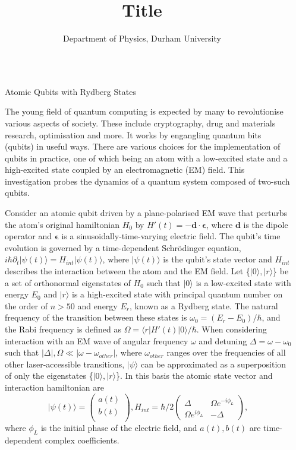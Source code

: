 \documentclass[final]{beamer}
\title{Title}
\author{Department of Physics, Durham University}
\institute[shortinst]{Short abstract.}
\newlength{\sepwidth}
\newlength{\colwidth}
\newcommand{\separatorcolumn}{\begin{column}{\sepwidth}\end{column}}
\begin{document}
\begin{frame}[t]
\begin{columns}[t]
\separatorcolumn

\begin{column}{\colwidth}

  \begin{block}{Atomic Qubits with Rydberg States}

    The young field of quantum computing is expected by many to revolutionise various aspects of society. These include
    cryptography, drug and materials research, optimisation and more. It works by engangling quantum bits (qubits)
    in useful ways. There are various choices for the implementation of qubits in practice, one of which being an atom with a
    low-excited state
    and a high-excited state coupled by an electromagnetic (EM) field. This investigation probes the dynamics of a quantum system
    composed of two-such qubits.

    Consider an atomic qubit driven by a plane-polarised EM wave that perturbs the atom's original hamiltonian $H_0$ by
     $H'(t)=-\mathbf{d} \cdot \mathbf{\epsilon}$,
    where $\mathbf{d}$
    is the dipole operator and $\mathbf{\epsilon}$ is a sinusoidally-time-varying electric field. The qubit's time evolution is
    governed by a time-dependent Schr\"odinger equation, $i\hbar \partial_t |\psi(t)\rangle = H_{int} |\psi(t)\rangle$, where
    $|\psi(t)\rangle$ is the qubit's state vector and $H_{int}$ describes the interaction between the atom and the EM field. Let
    \{$|0\rangle, |r\rangle$\} be a set of orthonormal eigenstates of $H_0$ such that $|0\rangle$ is a low-excited state with
    energy $E_0$ and
    $|r\rangle$ is a high-excited state with principal quantum number on the order of $n>50$ and energy $E_r$,
    known as a Rydberg state. The
    natural frequency of the transition between these states is $\omega_0 = (E_r - E_0) / \hbar$, and the Rabi frequency is
    defined as $\Omega=\langle r|H'(t)|0\rangle / \hbar$.  When
    considering interaction with an EM wave of angular frequency $\omega$ and detuning $\Delta = \omega - \omega_0$
    such that $|\Delta|,\Omega \ll |\omega - \omega_{other}|$, where $\omega_{other}$ ranges over the frequencies of all other
    laser-accessible transitions, $|\psi\rangle$ can be approximated as a superposition of only the eigenstates
    \{$|0\rangle, |r\rangle$\}. In this basis the atomic state vector and interaction hamiltonian are
    $$
    |\psi(t)\rangle = \begin{pmatrix}
    a(t) \\
    b(t) \\
    \end{pmatrix}, H_{int} = \hbar/2
    \begin{pmatrix}
    \Delta & \Omega e^{-i \phi_L} \\
    \Omega e^{i \phi_L} & -\Delta
    \end{pmatrix},
    $$
    where $\phi_L$ is the initial phase of the electric field, and $a(t),b(t)$ are time-dependent complex coefficients.


\end{block}
\end{column}
\end{columns}
\end{frame}
\end{document}
